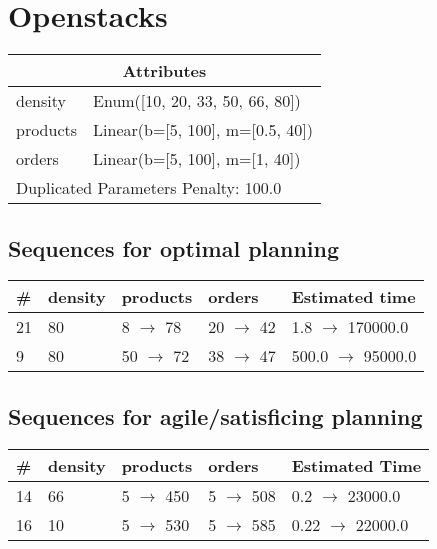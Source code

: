\documentclass{article}
\begin{document}
                            \newpage \section{Openstacks}
                    \begin{center}
                    \begin{tabular}{@{}p{}p{}@{}}
                    \multicolumn{2}{c}{\bf \large Attributes}\\\midrule
                    density & Enum([10, 20, 33, 50, 66, 80])\\
products & Linear(b=[5, 100], m=[0.5, 40])\\
orders & Linear(b=[5, 100], m=[1, 40]) \\\midrule
                    \multicolumn{2}{l}{Duplicated Parameters Penalty: 100.0}
                    \end{tabular}
                    \end{center}
                
                            \subsection*{Sequences for optimal planning}

                            \begin{center}
                            \begin{tabular}{@{}l|l|l|l|l@{}}
                            \# & density & products & orders & Estimated time\\\midrule
                            21&80&8 $\rightarrow$ 78&20 $\rightarrow$ 42&1.8 $\rightarrow$ 170000.0\\
9&80&50 $\rightarrow$ 72&38 $\rightarrow$ 47&500.0 $\rightarrow$ 95000.0
                            \end{tabular}
                            \end{center}
                    
                         \subsection*{Sequences for agile/satisficing planning}

                        \begin{center}
                        \begin{tabular}{@{}l|l|l|l|l@{}}
                        \# & density & products & orders & Estimated Time\\\midrule
                        14&66&5 $\rightarrow$ 450&5 $\rightarrow$ 508&0.2 $\rightarrow$ 23000.0\\
16&10&5 $\rightarrow$ 530&5 $\rightarrow$ 585&0.22 $\rightarrow$ 22000.0
                        \end{tabular}
                        \end{center}
                    
\end{document}
